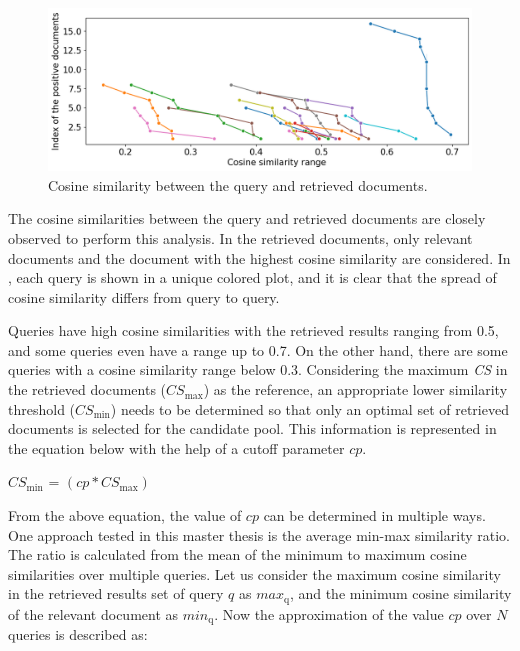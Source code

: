  
 \begin{figure}[h]
 	\centering
 	\includegraphics[width=.99\textwidth]{images/results/candidate_pool_analysis.png}
 	\caption[Cosine similarity distribution.]{Cosine similarity between the query and retrieved documents. \label{fig:cosine_sim_range}}
 \end{figure}
 
The cosine similarities between the query and retrieved documents are closely observed to perform this analysis. In the retrieved documents, only relevant documents and the document with the highest cosine similarity are considered. In , each query is shown in a unique colored plot, and it is clear that the spread of cosine similarity differs from query to query. 

Queries have high cosine similarities with the retrieved results ranging from 0.5, and some queries even have a range up to 0.7. On the other hand, there are some queries with a cosine similarity range below 0.3. Considering the maximum \emph{\ac{CS}} in the retrieved documents ($CS_{\mathrm{max}}$) as the reference, an appropriate lower similarity threshold ($CS_{\mathrm{min}}$) needs to be determined so that only an optimal set of retrieved documents is selected for the candidate pool. This information is represented in the equation below with the help of a cutoff parameter $cp$.
 \\
 
 	\centerline{$CS_{\mathrm{min}}$ = $( cp * CS_{\mathrm{max}} )$}
 	
 	
From the above equation, the value of $cp$ can be determined in multiple ways. One approach tested in this master thesis is the average min-max similarity ratio. The ratio is calculated from the mean of the minimum to maximum cosine similarities over multiple queries. Let us consider the maximum cosine similarity in the retrieved results set of query $q$ as $ max_{\mathrm{q}}$, and the minimum cosine similarity of the relevant document as $ min_{\mathrm{q}}$. Now the approximation of the value $cp$ over $N$ queries is described as:


